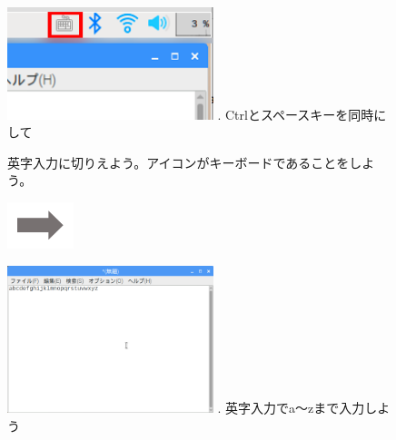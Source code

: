 \documentclass[a4paper,12pt]{jarticle}
\begin{document}
\begin{figure}[ht]
  \begin{minipage}{7.238cm}
    \includegraphics[width=6cm]{textbook-img059.png}
    . Ctrlとスペースキーを同時にして

    英字入力に切りえよう。アイコンがキーボードであることをしよう。
  \end{minipage}
  \includegraphics[width=1.919cm]{textbook-img053.png}
  \begin{minipage}{7.351cm}
    \includegraphics[width=6cm]{textbook-img061.png}
    . 英字入力でa〜zまで入力しよう
  \end{minipage}


\end{figure}
\end{document}
